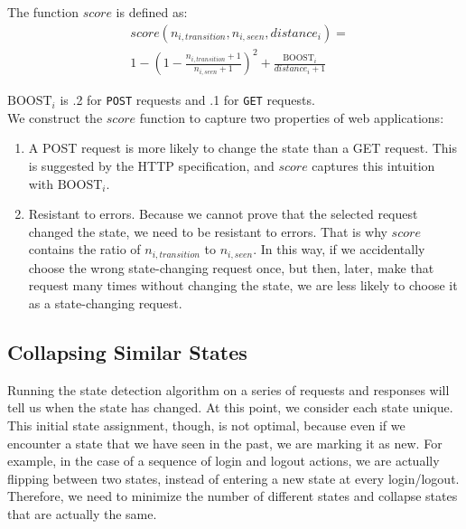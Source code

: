 The function \noindent{}$score$ is defined as:\\
\[
\begin{array}{ll}
&score(n_{i,transition}, n_{i,seen}, distance_i) = \\
&1-(1 - \frac{n_{i,transition} +1}{n_{i,seen} + 1})^2+\frac{\text{BOOST}_i}{distance_i + 1}
\end{array}
\]

\noindent{}$\text{BOOST}_i$ is .2 for \texttt{POST} requests and .1 for \texttt{GET}
requests. \\

We construct the $score$ function to capture two properties of web applications:
\begin{enumerate}
\item{}A POST request is more likely to change the state than a GET request. This is
suggested by the HTTP specification, and $score$ captures this intuition with
$\text{BOOST}_i$.

\item{}Resistant to errors. Because we cannot prove that the selected request
  changed the state, we need to be resistant to errors. That is why $score$
  contains the ratio of $n_{i,transition}$ to $n_{i,seen}$. In this way, if we
  accidentally choose the wrong state-changing request once, but then, later,
  make that request many times without changing the state, we are less likely
  to choose it as a state-changing request.
\end{enumerate}

\subsection{Collapsing Similar States}

Running the state detection algorithm on a series of requests and responses
will tell us when the state has changed. At this point, we consider each state
unique. This initial state assignment, though, is not optimal, because even if we
encounter a state that we have seen in the past, we are marking it as new. For
example, in the case of a sequence of login and logout actions, we are actually
flipping between two states, instead of entering a new state at every
login/logout. Therefore, we need to minimize the number of different states and collapse
states that are actually the same.

